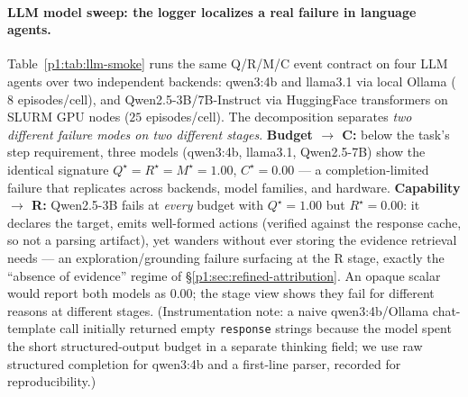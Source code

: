 \documentclass{article}
\begin{document}
\paragraph{LLM model sweep: the logger localizes a real failure in language agents.}
Table~\ref{p1:tab:llm-smoke} runs the same Q/R/M/C event contract on four LLM agents over two independent backends: qwen3:4b and llama3.1 via local Ollama ($8$ episodes/cell), and Qwen2.5-3B/7B-Instruct via HuggingFace transformers on SLURM GPU nodes ($25$ episodes/cell). The decomposition separates \emph{two different failure modes on two different stages}. \textbf{Budget $\to$ C:} below the task's step requirement, three models (qwen3:4b, llama3.1, Qwen2.5-7B) show the identical signature $Q^\star{=}R^\star{=}M^\star{=}1.00$, $C^\star{=}0.00$ --- a completion-limited failure that replicates across backends, model families, and hardware. \textbf{Capability $\to$ R:} Qwen2.5-3B fails at \emph{every} budget with $Q^\star{=}1.00$ but $R^\star{=}0.00$: it declares the target, emits well-formed actions (verified against the response cache, so not a parsing artifact), yet wanders without ever storing the evidence retrieval needs --- an exploration/grounding failure surfacing at the R stage, exactly the ``absence of evidence'' regime of \S\ref{p1:sec:refined-attribution}. An opaque scalar would report both models as $0.00$; the stage view shows they fail for different reasons at different stages. (Instrumentation note: a naive qwen3:4b/Ollama chat-template call initially returned empty \texttt{response} strings because the model spent the short structured-output budget in a separate thinking field; we use raw structured completion for qwen3:4b and a first-line parser, recorded for reproducibility.)
\end{document}
